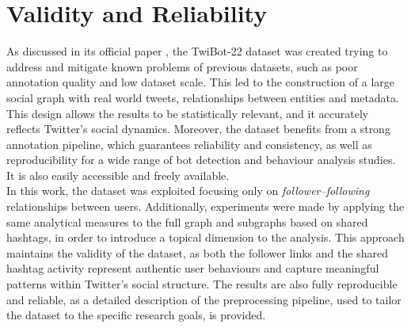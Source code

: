 \documentclass[12pt, a4paper]{article}
\begin{document}
\section{Validity and Reliability} \label{validity-and-reliability-not-needed-for-the-project-proposal}
	As discussed in its official paper \cite{twibot22}, the TwiBot-22 dataset was created trying to address and mitigate known problems of previous datasets, such as poor annotation quality and low dataset scale. This led to the construction of a large social graph with real world tweets, relationships between entities and metadata. This design allows the results to be statistically relevant, and it accurately reflects Twitter’s social dynamics. Moreover, the dataset benefits from a strong annotation pipeline, which guarantees reliability and consistency, as well as reproducibility for a wide range of bot detection and behaviour analysis studies. It is also easily accessible and freely available.\\
    In this work, the dataset was exploited focusing only on \textit{follower--following} relationships between users. Additionally, experiments were made by applying the same analytical measures to the full graph and subgraphs based on shared hashtags, in order to introduce a topical dimension to the analysis. This approach maintains the validity of the dataset, as both the follower links and the shared hashtag activity represent authentic user behaviours and capture meaningful patterns within Twitter’s social structure. The results are also fully reproducible and reliable, as a detailed description of the preprocessing pipeline, used to tailor the dataset to the specific research goals, is provided.
\end{document}
